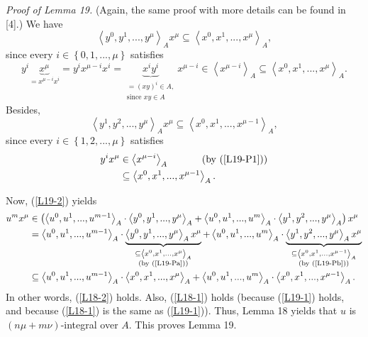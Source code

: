 \documentclass[12pt,final,notitlepage,onecolumn]{article}%
\begin{document}
\textit{Proof of Lemma 19.} (Again, the same proof with more details can be
found in [4].) We have%
\begin{equation}
\left\langle y^{0},y^{1},...,y^{\mu}\right\rangle _{A}x^{\mu}\subseteq
\left\langle x^{0},x^{1},...,x^{\mu}\right\rangle _{A}, \label{L19-Pa}%
\end{equation}
since every $i\in\left\{  0,1,...,\mu\right\}  $ satisfies%
\[
y^{i}\underbrace{x^{\mu}}_{=x^{\mu-i}x^{i}}=y^{i}x^{\mu-i}x^{i}%
=\underbrace{x^{i}y^{i}}_{\substack{=\left(  xy\right)  ^{i}\in
A,\\\text{since }xy\in A}}x^{\mu-i}\in\left\langle x^{\mu-i}\right\rangle
_{A}\subseteq\left\langle x^{0},x^{1},...,x^{\mu}\right\rangle _{A}.
\]
Besides,%
\begin{equation}
\left\langle y^{1},y^{2},...,y^{\mu}\right\rangle _{A}x^{\mu}\subseteq
\left\langle x^{0},x^{1},...,x^{\mu-1}\right\rangle _{A}, \label{L19-Pb}%
\end{equation}
since every $i\in\left\{  1,2,...,\mu\right\}  $ satisfies%
\begin{align*}
y^{i}x^{\mu}  &  \in\left\langle x^{\mu-i}\right\rangle _{A}%
\ \ \ \ \ \ \ \ \ \ \left(  \text{by (\ref{L19-P1})}\right) \\
&  \subseteq\left\langle x^{0},x^{1},...,x^{\mu-1}\right\rangle _{A}.
\end{align*}


Now, (\ref{L19-2}) yields%
\begin{align*}
u^{m}x^{\mu}  &  \in\left(  \left\langle u^{0},u^{1},...,u^{m-1}\right\rangle
_{A}\cdot\left\langle y^{0},y^{1},...,y^{\mu}\right\rangle _{A}+\left\langle
u^{0},u^{1},...,u^{m}\right\rangle _{A}\cdot\left\langle y^{1},y^{2}%
,...,y^{\mu}\right\rangle _{A}\right)  x^{\mu}\\
&  =\left\langle u^{0},u^{1},...,u^{m-1}\right\rangle _{A}\cdot
\underbrace{\left\langle y^{0},y^{1},...,y^{\mu}\right\rangle _{A}x^{\mu}%
}_{\substack{\subseteq\left\langle x^{0},x^{1},...,x^{\mu}\right\rangle
_{A}\\\left(  \text{by (\ref{L19-Pa})}\right)  }}+\left\langle u^{0}%
,u^{1},...,u^{m}\right\rangle _{A}\cdot\underbrace{\left\langle y^{1}%
,y^{2},...,y^{\mu}\right\rangle _{A}x^{\mu}}_{\substack{\subseteq\left\langle
x^{0},x^{1},...,x^{\mu-1}\right\rangle _{A}\\\left(  \text{by (\ref{L19-Pb}%
)}\right)  }}\\
&  \subseteq\left\langle u^{0},u^{1},...,u^{m-1}\right\rangle _{A}%
\cdot\left\langle x^{0},x^{1},...,x^{\mu}\right\rangle _{A}+\left\langle
u^{0},u^{1},...,u^{m}\right\rangle _{A}\cdot\left\langle x^{0},x^{1}%
,...,x^{\mu-1}\right\rangle _{A}.
\end{align*}
In other words, (\ref{L18-2}) holds. Also, (\ref{L18-1}) holds (because
(\ref{L19-1}) holds, and because (\ref{L18-1}) is the same as (\ref{L19-1})).
Thus, Lemma 18 yields that $u$ is $\left(  n\mu+m\nu\right)  $-integral over
$A$. This proves Lemma 19.
\end{document}
